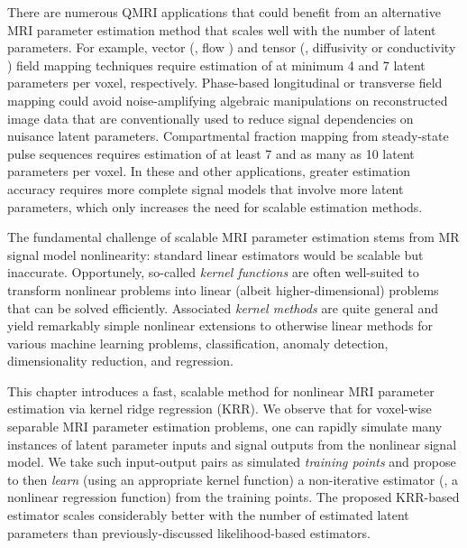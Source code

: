 There are numerous QMRI applications
that could benefit from an alternative MRI parameter estimation method
that scales well with the number of latent parameters.
For example,
vector (\eg, flow \cite{feinberg:85:mri})
and tensor 
(\eg, diffusivity \cite{bihan:01:dti} or conductivity \cite{tuch:01:ctm})
field mapping techniques
require estimation 
of at minimum 4 and 7 latent parameters per voxel,
respectively.
Phase-based longitudinal \cite{sekihara:85:nif} 
or transverse \cite{morrell:08:aps,sacolick:10:bmb} field mapping
could avoid noise-amplifying algebraic manipulations
on reconstructed image data
that are conventionally used
to reduce signal dependencies 
on nuisance latent parameters.
Compartmental fraction mapping \cite{mackay:94:ivv}
from steady-state pulse sequences
requires estimation of at least 7 \cite{deoni:08:gmt}
and as many as 10 \cite{deoni:13:oct}
latent parameters per voxel.
In these and other applications,
greater estimation accuracy
requires more complete signal models
that involve more latent parameters,
which only increases the need 
for scalable estimation methods.


The fundamental challenge 
of scalable MRI parameter estimation
stems from MR signal model nonlinearity:
standard linear estimators
would be scalable but inaccurate.
Opportunely,
so-called \emph{kernel functions} \cite{aronszajn:50:tor}
are often well-suited 
to transform nonlinear problems
into linear (albeit higher-dimensional) problems
that can be solved efficiently. 
Associated \emph{kernel methods} \cite{scholkopf:01:agr}
are quite general
and yield remarkably simple nonlinear extensions
to otherwise linear methods
for various machine learning problems,
\eg classification,
anomaly detection,
dimensionality reduction,
and regression.

This chapter introduces a fast, scalable method 
for nonlinear MRI parameter estimation
via kernel ridge regression (KRR).
We observe that 
for voxel-wise separable MRI parameter estimation problems,
one can rapidly simulate many instances
of latent parameter inputs and signal outputs
from the nonlinear signal model.
We take such input-output pairs
as simulated \emph{training points}
and propose to then \emph{learn}
(using an appropriate kernel function)
a non-iterative estimator
(\ie, a nonlinear regression function)
from the training points.
The proposed KRR-based estimator scales considerably better
with the number of estimated latent parameters
than previously-discussed likelihood-based estimators.

